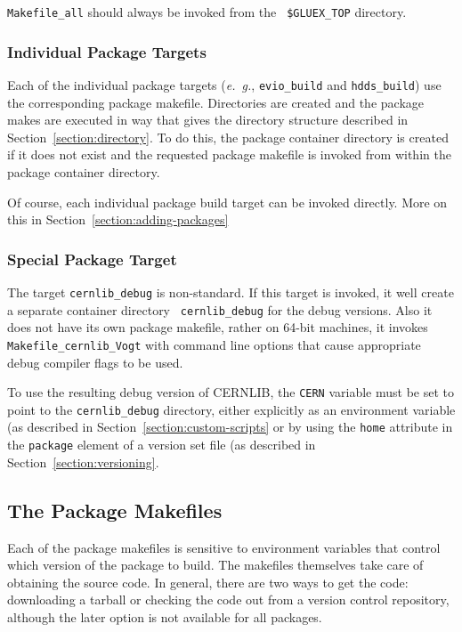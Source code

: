 \documentclass[12pt]{article}
\begin{document}
{{\tt Makefile\_all}} should always be invoked from the {\tt
  \$GLUEX\_TOP} directory.

\subsubsection{Individual Package Targets}

Each of the individual package targets ({\it e.~g.}, {\tt evio\_build}
and {\tt hdds\_build}) use the corresponding package
makefile. Directories are created and the package makes are executed
in way that gives the directory structure described in
Section~\ref{section:directory}. To do this, the package container
directory is created if it does not exist and the requested package
makefile is invoked from within the package container directory.

Of course, each individual package build target can be invoked
directly. More on this in Section~\ref{section:adding-packages}

\subsubsection{Special Package Target}

The target {\tt cernlib\_debug} is non-standard. If this target is
invoked, it well create a separate container directory {\tt
  cernlib\_debug} for the debug versions. Also it does not have its
own package makefile, rather on 64-bit machines, it invokes {\tt
  Makefile\_cernlib\_Vogt} with command line options that cause
appropriate debug compiler flags to be used.

To use the resulting debug version of CERNLIB, the {\tt CERN} variable
must be set to point to the {\tt cernlib\_debug} directory, either explicitly as an environment variable (as described in Section~\ref{section:custom-scripts} or by using the {\tt home} attribute in the {\tt package} element of a version set file (as described in Section~\ref{section:versioning}.

\subsection{The Package Makefiles}\label{section:package-makefiles}

Each of the package makefiles is sensitive to environment variables
that control which version of the package to build. The makefiles
themselves take care of obtaining the source code. In general, there
are two ways to get the code: downloading a tarball or checking the
code out from a version control repository, although the later option
is not available for all packages.
\end{document}
